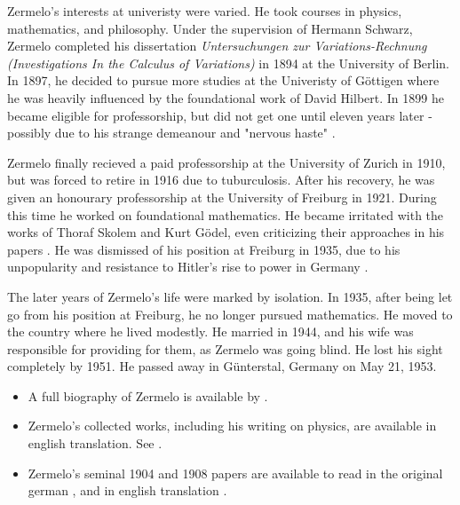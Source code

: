 \documentclass[../../../include/open-logic-section]{subfiles}
\begin{document}
Zermelo's interests at univeristy were varied. He took courses in physics,
mathematics, and philosophy. Under the supervision of Hermann Schwarz,
Zermelo completed his dissertation \emph{Untersuchungen zur
Variations-Rechnung (Investigations In the Calculus of Variations)} in 1894
at the University of Berlin. In 1897, he decided to pursue more studies at
the Univeristy of G\"{o}ttigen where he was heavily influenced by the
foundational work of David Hilbert. In 1899 he became eligible for
professorship, but did not get one until eleven years later - possibly due
to his strange demeanour and "nervous haste" \citep[15]{Ebbinghaus2010}.

Zermelo finally recieved a paid professorship at the University of Zurich
in 1910, but was forced to retire in 1916 due to tuburculosis. After his
recovery, he was given an honourary professorship at the University of
Freiburg in 1921. During this time he worked on foundational mathematics.
He became irritated with the works of Thoraf Skolem and Kurt G\"{o}del,
even criticizing their approaches in his papers \citep[31]{Ebbinghaus2010}.
He was dismissed of his position at Freiburg in 1935, due to his
unpopularity and resistance to Hitler's rise to power in Germany
\citep[32]{Ebbinghaus2015}.
 
The later years of Zermelo's life were marked by isolation. In 1935, after
being let go from his position at Freiburg, he no longer pursued
mathematics. He moved to the country where he lived modestly. He married in
1944, and his wife was responsible for providing for them, as Zermelo was
going blind. He lost his sight completely by 1951. He passed away in
G\"{u}nterstal, Germany on May 21, 1953. 

\begin{reading}

\begin{itemize} 
\item A full biography of Zermelo is available by \citet{Ebbinghaus2015}.

\item Zermelo's collected works, including his writing on physics, are 
available in english translation. See \citet{Ebbinghaus2010,Ebbinghaus2013}.

\item Zermelo's seminal 1904 and 1908 papers are available to read in the
original german \citep{Zermelo1904,Zermelo1908}, and in english translation
 \citep{Ebbinghaus2013}.

\end{itemize}
 \end{reading}
\end{document}
